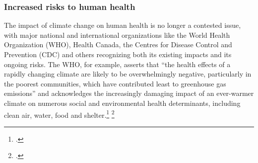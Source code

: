 	\subsubsection{Increased risks to human health}



The impact of climate change on human health is no longer a contested issue, with major national and international organizations like the World Health Organization (WHO), Health Canada, the Centres for Disease Control and Prevention (CDC) and others recognizing both its existing impacts and its ongoing risks. 
The WHO, for example, asserts that ``the health effects of a rapidly changing climate are likely to be overwhelmingly negative, particularly in the poorest communities, which have contributed least to greenhouse gas emissions'' and acknowledges the increasingly damaging impact of an ever-warmer climate on numerous social and environmental health determinants, including clean air, water, food and shelter.\footcite[][]{WHOClimateHealth} \footcite[See also: ][]{LancetCCHealth}



